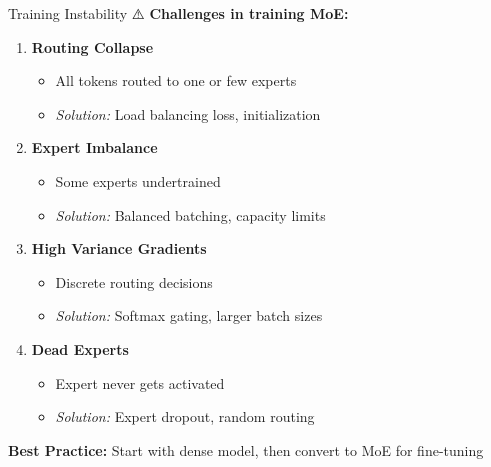 \documentclass[aspectratio=169]{beamer}
\begin{document}
\begin{frame}[shrink=10]{Training Instability ⚠️}
\textbf{Challenges in training MoE:}

\vspace{0.5em}

\begin{enumerate}\setlength{\itemsep}{0pt}
    \item \textbf{Routing Collapse}
    \begin{itemize}\setlength{\itemsep}{0pt}
        \item All tokens routed to one or few experts
        \item \textit{Solution:} Load balancing loss, initialization
    \end{itemize}

    \item \textbf{Expert Imbalance}
    \begin{itemize}\setlength{\itemsep}{0pt}
        \item Some experts undertrained
        \item \textit{Solution:} Balanced batching, capacity limits
    \end{itemize}

    \item \textbf{High Variance Gradients}
    \begin{itemize}\setlength{\itemsep}{0pt}
        \item Discrete routing decisions
        \item \textit{Solution:} Softmax gating, larger batch sizes
    \end{itemize}

    \item \textbf{Dead Experts}
    \begin{itemize}\setlength{\itemsep}{0pt}
        \item Expert never gets activated
        \item \textit{Solution:} Expert dropout, random routing
    \end{itemize}
\end{enumerate}

\vspace{0.5em}

\textbf{Best Practice:} Start with dense model, then convert to MoE for fine-tuning
\end{frame}
\end{document}
